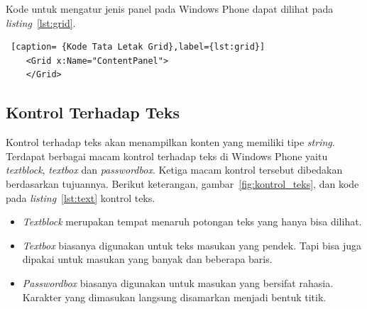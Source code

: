 Kode untuk mengatur jenis panel pada Windows Phone dapat dilihat pada \textit{listing}~\ref{lst:grid}.
\begin{lstlisting} [caption= {Kode Tata Letak Grid},label={lst:grid}]
	<Grid x:Name="ContentPanel">
	</Grid>
\end{lstlisting}
	
\subsection{Kontrol Terhadap Teks \cite{MSDN}}
\label{subsubsec:Kontrol Terhadap Teks}
\hspace{0.5cm} Kontrol terhadap teks  akan menampilkan konten yang memiliki tipe \textit{string}. Terdapat berbagai macam kontrol terhadap teks di Windows Phone yaitu \textit{textblock}, \textit{textbox} dan \textit{passwordbox}. Ketiga macam kontrol tersebut dibedakan berdasarkan tujuannya. Berikut keterangan, gambar~\ref{fig:kontrol_teks}, dan kode pada \textit{listing}~\ref{lst:text} kontrol teks.

\begin{itemize}
	\item \textit{Textblock} merupakan tempat menaruh potongan teks yang hanya bisa dilihat.
	\item \textit{Textbox} biasanya digunakan untuk teks masukan yang pendek. Tapi bisa juga dipakai untuk masukan yang banyak dan beberapa baris.
	\item \textit{Passwordbox} biasanya digunakan untuk masukan yang bersifat rahasia. Karakter yang dimasukan langsung disamarkan menjadi bentuk titik.
\end{itemize}

